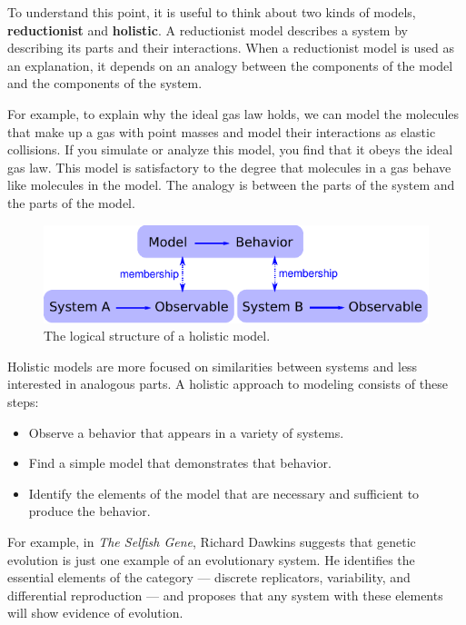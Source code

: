 \documentclass[12pt]{book}
\theoremstyle{exercise}
\begin{document}
To understand this point, it is useful to think about two
kinds of models, {\bf reductionist} and {\bf holistic}.  A
reductionist model describes a system by describing its parts
and their interactions.  When a reductionist model is used
as an explanation, it depends on an analogy between the
components of the model and the components of the system.


For example, to explain why the ideal gas law holds, we can model the
molecules that make up a gas with point masses and model their
interactions as elastic collisions.  If you simulate or analyze this
model, you find that it obeys the ideal gas law.  This model is
satisfactory to the degree that molecules in a gas behave like
molecules in the model.  The analogy is between the parts of the
system and the parts of the model.


\begin{figure}
\centerline{\includegraphics[width=5in]{figs/model2.pdf}}
\caption{The logical structure of a holistic model.\label{fig.model2}}
\end{figure}

Holistic models are more focused on similarities between systems and
less interested in analogous parts.  A holistic approach to modeling
consists of these steps:


\begin{itemize}

\item Observe a behavior that appears in a variety of systems.

\item Find a simple model that demonstrates that behavior.

\item Identify the elements of the model that are necessary and
sufficient to produce the behavior.

\end{itemize}

For example, in {\em The Selfish Gene}, Richard Dawkins suggests that
genetic evolution is just one example of an evolutionary system.  He
identifies the essential elements of the category --- discrete
replicators, variability, and differential reproduction --- and proposes
that any system with these elements will show evidence of evolution.
\end{document}
